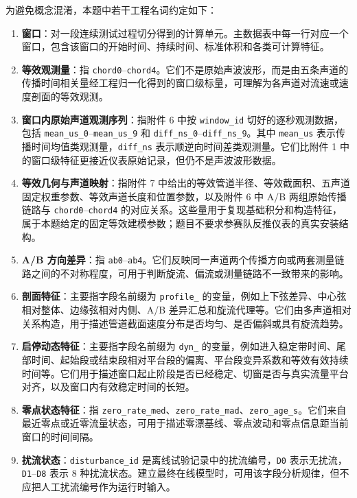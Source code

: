 \documentclass[UTF8,a4paper,11pt]{ctexart}
\begin{document}
为避免概念混淆，本题中若干工程名词约定如下：
\begin{enumerate}
  \item \textbf{窗口}：对一段连续测试过程切分得到的计算单元。主数据表中每一行对应一个窗口，包含该窗口的开始时间、持续时间、标准体积和各类可计算特征。
  \item \textbf{等效观测量}：指 \texttt{chord0}--\texttt{chord4}。它们不是原始声波波形，而是由五条声道的传播时间相关量经工程归一化得到的窗口级标量，可理解为各声道对流速或速度剖面的等效观测。
  \item \textbf{窗口内原始声道观测序列}：指附件 6 中按 \texttt{window\_id} 切好的逐秒观测数据，包括 \texttt{mean\_us\_0}--\texttt{mean\_us\_9} 和 \texttt{diff\_ns\_0}--\texttt{diff\_ns\_9}。其中 \texttt{mean\_us} 表示传播时间均值类观测量，\texttt{diff\_ns} 表示顺逆向时间差类观测量。它们比附件 1 中的窗口级特征更接近仪表原始记录，但仍不是声波波形数据。
  \item \textbf{等效几何与声道映射}：指附件 7 中给出的等效管道半径、等效截面积、五声道固定权重参数、等效声道长度和位置参数，以及附件 6 中 A/B 两组原始传播链路与 \texttt{chord0}--\texttt{chord4} 的对应关系。这些量用于复现基础积分和构造特征，属于本题给定的固定等效建模参数；题目不要求参赛队反推仪表的真实安装结构。
  \item \textbf{A/B 方向差异}：指 \texttt{ab0}--\texttt{ab4}。它们反映同一声道两个传播方向或两套测量链路之间的不对称程度，可用于判断旋流、偏流或测量链路不一致带来的影响。
  \item \textbf{剖面特征}：主要指字段名前缀为 \texttt{profile\_} 的变量，例如上下弦差异、中心弦相对整体、边缘弦相对内侧、A/B 差异汇总和旋流代理等。它们由多声道相对关系构造，用于描述管道截面速度分布是否均匀、是否偏斜或具有旋流趋势。
  \item \textbf{启停动态特征}：主要指字段名前缀为 \texttt{dyn\_} 的变量，例如进入稳定带时间、尾部时间、起始段或结束段相对平台段的偏离、平台段变异系数和等效有效持续时间等。它们用于描述窗口起止阶段是否已经稳定、切窗是否与真实流量平台对齐，以及窗口内有效稳定时间的长短。
  \item \textbf{零点状态特征}：指 \texttt{zero\_rate\_med}、\texttt{zero\_rate\_mad}、\texttt{zero\_age\_s}。它们来自最近零点或近零流量状态，可用于描述零漂基线、零点波动和零点信息距当前窗口的时间间隔。
  \item \textbf{扰流状态}：\texttt{disturbance\_id} 是离线试验记录中的扰流编号，\texttt{D0} 表示无扰流，\texttt{D1}--\texttt{D8} 表示 8 种扰流状态。建立最终在线模型时，可用该字段分析规律，但不应把人工扰流编号作为运行时输入。
\end{enumerate}
\end{document}
